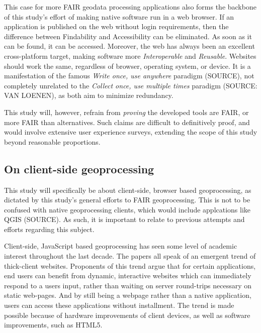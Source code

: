 This case for more FAIR geodata processing applications also forms the backbone of this study's effort of making native software run in a web browser. If an application is published on the web without login requirements, then the difference between Findability and Accessibility can be eliminated. As soon as it can be found, it can be accessed. 
Moreover, the web has always been an excellent cross-platform target, making software more \textit{Interoperable} and \textit{Reusable}. 
Websites should work the same, regardless of browser, operating system, or device. 
It is a manifestation of the famous \textit{Write once, use anywhere} paradigm (SOURCE), not completely unrelated to the \textit{Collect once, use multiple times} paradigm (SOURCE: VAN LOENEN), as both aim to minimize redundancy.

This study will, however, refrain from \textit{proving} the developed tools are FAIR, or more FAIR than alternatives. Such claims are difficult to definitively proof, and would involve extensive user experience surveys, extending the scope of this study beyond reasonable proportions.  




\subsection{On client-side geoprocessing}

This study will specifically be about client-side, browser based geoprocessing, as dictated by this study's general efforts to FAIR geoprocessing. This is not to be confused with native geoprocessing clients, which would include applcations like QGIS (SOURCE). As such, it is important to relate to previous attempts and efforts regarding this subject. 

Client-side, JavaScript based geoprocessing has seen some level of academic interest throughout the last decade. The papers \cite{hamilton_client-side_2014, panidi_hybrid_2015, kulawiak_analysis_2019} all speak of an emergent trend of thick-client websites. Proponents of this trend argue that for certain applications, end users can benefit from dynamic, interactive websites which can immediately respond to a users input, rather than waiting on server round-trips necessary on static web-pages. And by still being a webpage rather than a native application, users can access these applications without installment. The trend is made possible because of hardware improvements of client devices, as well as software improvements, such as HTML5. 

